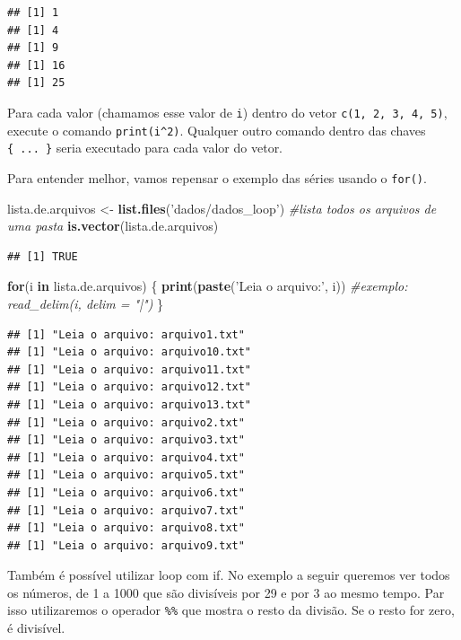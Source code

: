 \documentclass[]{book}
\newenvironment{Shaded}{\begin{snugshade}}{\end{snugshade}}
\newcommand{\KeywordTok}[1]{\textcolor[rgb]{0.13,0.29,0.53}{\textbf{#1}}}
\newcommand{\StringTok}[1]{\textcolor[rgb]{0.31,0.60,0.02}{#1}}
\newcommand{\CommentTok}[1]{\textcolor[rgb]{0.56,0.35,0.01}{\textit{#1}}}
\newcommand{\ControlFlowTok}[1]{\textcolor[rgb]{0.13,0.29,0.53}{\textbf{#1}}}
\newcommand{\NormalTok}[1]{#1}
\begin{document}
\begin{verbatim}
## [1] 1
## [1] 4
## [1] 9
## [1] 16
## [1] 25
\end{verbatim}

Para cada valor (chamamos esse valor de \texttt{i}) dentro do vetor
\texttt{c(1,\ 2,\ 3,\ 4,\ 5)}, execute o comando \texttt{print(i\^{}2)}.
Qualquer outro comando dentro das chaves \texttt{\{\ ...\ \}} seria
executado para cada valor do vetor.

Para entender melhor, vamos repensar o exemplo das séries usando o
\texttt{for()}.

\begin{Shaded}
\begin{Highlighting}[]
\NormalTok{lista.de.arquivos <-}\StringTok{ }\KeywordTok{list.files}\NormalTok{(}\StringTok{'dados/dados_loop'}\NormalTok{) }\CommentTok{#lista todos os arquivos de uma pasta}
\KeywordTok{is.vector}\NormalTok{(lista.de.arquivos)}
\end{Highlighting}
\end{Shaded}

\begin{verbatim}
## [1] TRUE
\end{verbatim}

\begin{Shaded}
\begin{Highlighting}[]
\ControlFlowTok{for}\NormalTok{(i }\ControlFlowTok{in}\NormalTok{ lista.de.arquivos) \{}
  \KeywordTok{print}\NormalTok{(}\KeywordTok{paste}\NormalTok{(}\StringTok{'Leia o arquivo:'}\NormalTok{, i))}
  \CommentTok{#exemplo: read_delim(i, delim = "|")}
\NormalTok{\}}
\end{Highlighting}
\end{Shaded}

\begin{verbatim}
## [1] "Leia o arquivo: arquivo1.txt"
## [1] "Leia o arquivo: arquivo10.txt"
## [1] "Leia o arquivo: arquivo11.txt"
## [1] "Leia o arquivo: arquivo12.txt"
## [1] "Leia o arquivo: arquivo13.txt"
## [1] "Leia o arquivo: arquivo2.txt"
## [1] "Leia o arquivo: arquivo3.txt"
## [1] "Leia o arquivo: arquivo4.txt"
## [1] "Leia o arquivo: arquivo5.txt"
## [1] "Leia o arquivo: arquivo6.txt"
## [1] "Leia o arquivo: arquivo7.txt"
## [1] "Leia o arquivo: arquivo8.txt"
## [1] "Leia o arquivo: arquivo9.txt"
\end{verbatim}

Também é possível utilizar loop com if. No exemplo a seguir queremos ver
todos os números, de 1 a 1000 que são divisíveis por 29 e por 3 ao mesmo
tempo. Par isso utilizaremos o operador \texttt{\%\%} que mostra o resto
da divisão. Se o resto for zero, é divisível.
\end{document}
